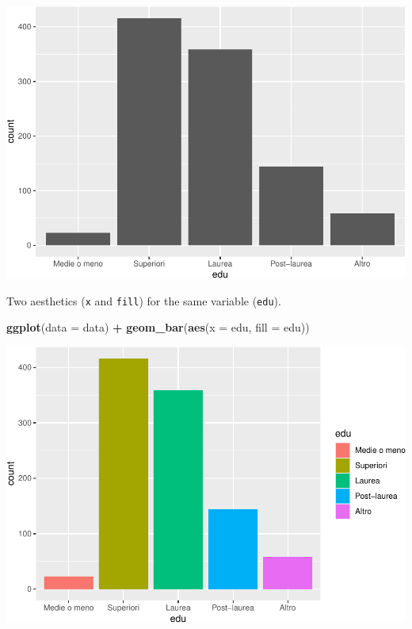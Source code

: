 \documentclass[
]{book}
\newenvironment{Shaded}{\begin{snugshade}}{\end{snugshade}}
\newcommand{\AttributeTok}[1]{\textcolor[rgb]{0.13,0.29,0.53}{#1}}
\newcommand{\FunctionTok}[1]{\textcolor[rgb]{0.13,0.29,0.53}{\textbf{#1}}}
\newcommand{\NormalTok}[1]{#1}
\newcommand{\SpecialCharTok}[1]{\textcolor[rgb]{0.81,0.36,0.00}{\textbf{#1}}}
\begin{document}
\includegraphics{R-for-social-research-and-business-analytics_files/figure-latex/unnamed-chunk-25-1.pdf}

Two aesthetics (\texttt{x} and \texttt{fill}) for the same variable (\texttt{edu}).

\begin{Shaded}
\begin{Highlighting}[]
\FunctionTok{ggplot}\NormalTok{(}\AttributeTok{data =}\NormalTok{ data) }\SpecialCharTok{+}
  \FunctionTok{geom\_bar}\NormalTok{(}\FunctionTok{aes}\NormalTok{(}\AttributeTok{x =}\NormalTok{ edu, }\AttributeTok{fill =}\NormalTok{ edu))}
\end{Highlighting}
\end{Shaded}

\includegraphics{R-for-social-research-and-business-analytics_files/figure-latex/unnamed-chunk-26-1.pdf}
\end{document}
